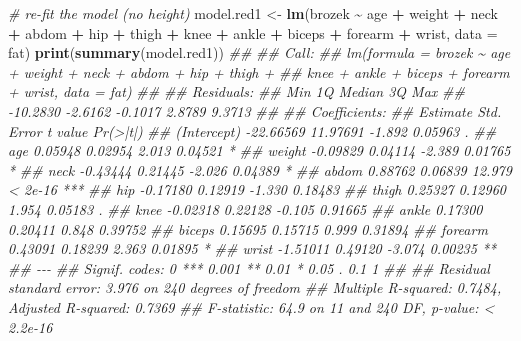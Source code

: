 \documentclass[
]{book}
\newenvironment{Shaded}{\begin{snugshade}}{\end{snugshade}}
\newcommand{\CommentTok}[1]{\textcolor[rgb]{0.56,0.35,0.01}{\textit{#1}}}
\newcommand{\DataTypeTok}[1]{\textcolor[rgb]{0.13,0.29,0.53}{#1}}
\newcommand{\KeywordTok}[1]{\textcolor[rgb]{0.13,0.29,0.53}{\textbf{#1}}}
\newcommand{\NormalTok}[1]{#1}
\newcommand{\OperatorTok}[1]{\textcolor[rgb]{0.81,0.36,0.00}{\textbf{#1}}}
\newcommand{\StringTok}[1]{\textcolor[rgb]{0.31,0.60,0.02}{#1}}
\theoremstyle{definition}
\theoremstyle{definition}
\theoremstyle{definition}
\theoremstyle{remark}
\begin{document}
\begin{Shaded}
\begin{Highlighting}[]
\CommentTok{\# re{-}fit the model (no height)}
\NormalTok{model.red1 \textless{}{-}}\StringTok{ }\KeywordTok{lm}\NormalTok{(brozek }\OperatorTok{\textasciitilde{}}\StringTok{ }\NormalTok{age }\OperatorTok{+}\StringTok{ }\NormalTok{weight }\OperatorTok{+}\StringTok{ }\NormalTok{neck }\OperatorTok{+}\StringTok{ }\NormalTok{abdom }\OperatorTok{+}\StringTok{ }\NormalTok{hip }\OperatorTok{+}\StringTok{ }\NormalTok{thigh }\OperatorTok{+}\StringTok{ }\NormalTok{knee }\OperatorTok{+}\StringTok{ }\NormalTok{ankle }\OperatorTok{+}\StringTok{ }\NormalTok{biceps }\OperatorTok{+}\StringTok{ }\NormalTok{forearm }\OperatorTok{+}\StringTok{ }\NormalTok{wrist, }\DataTypeTok{data =}\NormalTok{ fat)}
\KeywordTok{print}\NormalTok{(}\KeywordTok{summary}\NormalTok{(model.red1))}
\CommentTok{\#\# }
\CommentTok{\#\# Call:}
\CommentTok{\#\# lm(formula = brozek \textasciitilde{} age + weight + neck + abdom + hip + thigh + }
\CommentTok{\#\#     knee + ankle + biceps + forearm + wrist, data = fat)}
\CommentTok{\#\# }
\CommentTok{\#\# Residuals:}
\CommentTok{\#\#      Min       1Q   Median       3Q      Max }
\CommentTok{\#\# {-}10.2830  {-}2.6162  {-}0.1017   2.8789   9.3713 }
\CommentTok{\#\# }
\CommentTok{\#\# Coefficients:}
\CommentTok{\#\#              Estimate Std. Error t value Pr(\textgreater{}|t|)    }
\CommentTok{\#\# (Intercept) {-}22.66569   11.97691  {-}1.892  0.05963 .  }
\CommentTok{\#\# age           0.05948    0.02954   2.013  0.04521 *  }
\CommentTok{\#\# weight       {-}0.09829    0.04114  {-}2.389  0.01765 *  }
\CommentTok{\#\# neck         {-}0.43444    0.21445  {-}2.026  0.04389 *  }
\CommentTok{\#\# abdom         0.88762    0.06839  12.979  \textless{} 2e{-}16 ***}
\CommentTok{\#\# hip          {-}0.17180    0.12919  {-}1.330  0.18483    }
\CommentTok{\#\# thigh         0.25327    0.12960   1.954  0.05183 .  }
\CommentTok{\#\# knee         {-}0.02318    0.22128  {-}0.105  0.91665    }
\CommentTok{\#\# ankle         0.17300    0.20411   0.848  0.39752    }
\CommentTok{\#\# biceps        0.15695    0.15715   0.999  0.31894    }
\CommentTok{\#\# forearm       0.43091    0.18239   2.363  0.01895 *  }
\CommentTok{\#\# wrist        {-}1.51011    0.49120  {-}3.074  0.00235 ** }
\CommentTok{\#\# {-}{-}{-}}
\CommentTok{\#\# Signif. codes:  0 \textquotesingle{}***\textquotesingle{} 0.001 \textquotesingle{}**\textquotesingle{} 0.01 \textquotesingle{}*\textquotesingle{} 0.05 \textquotesingle{}.\textquotesingle{} 0.1 \textquotesingle{} \textquotesingle{} 1}
\CommentTok{\#\# }
\CommentTok{\#\# Residual standard error: 3.976 on 240 degrees of freedom}
\CommentTok{\#\# Multiple R{-}squared:  0.7484,	Adjusted R{-}squared:  0.7369 }
\CommentTok{\#\# F{-}statistic:  64.9 on 11 and 240 DF,  p{-}value: \textless{} 2.2e{-}16}


\end{Highlighting}
\end{Shaded}
\end{document}
